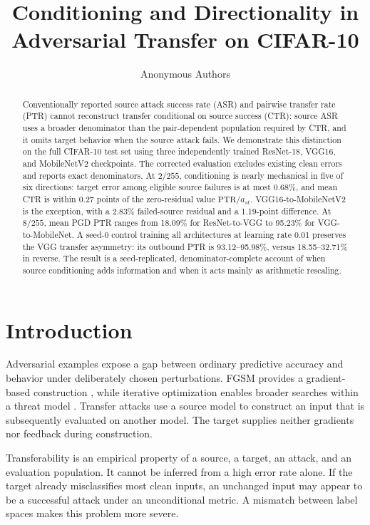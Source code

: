 \documentclass[10pt]{article}
\title{Conditioning and Directionality in Adversarial Transfer on CIFAR-10}
\author{\name Anonymous Authors}
\begin{document}
\maketitle
\begin{abstract}
Conventionally reported source attack success rate (ASR) and pairwise transfer rate (PTR) cannot reconstruct transfer conditional on source success (CTR): source ASR uses a broader denominator than the pair-dependent population required by CTR, and it omits target behavior when the source attack fails. We demonstrate this distinction on the full CIFAR-10 test set using three independently trained ResNet-18, VGG16, and MobileNetV2 checkpoints. The corrected evaluation excludes existing clean errors and reports exact denominators. At $2/255$, conditioning is nearly mechanical in five of six directions: target error among eligible source failures is at most 0.68\%, and mean CTR is within 0.27 points of the zero-residual value $\mathrm{PTR}/a_{st}$. VGG16-to-MobileNetV2 is the exception, with a 2.83\% failed-source residual and a 1.19-point difference. At $8/255$, mean PGD PTR ranges from 18.09\% for ResNet-to-VGG to 95.23\% for VGG-to-MobileNet. A seed-0 control training all architectures at learning rate 0.01 preserves the VGG transfer asymmetry: its outbound PTR is 93.12--95.98\%, versus 18.55--32.71\% in reverse. The result is a seed-replicated, denominator-complete account of when source conditioning adds information and when it acts mainly as arithmetic rescaling.
\end{abstract}

\section{Introduction}
Adversarial examples expose a gap between ordinary predictive accuracy and behavior under deliberately chosen perturbations. FGSM provides a gradient-based construction \citep{goodfellow}, while iterative optimization enables broader searches within a threat model \citep{madry,carlini}. Transfer attacks use a source model to construct an input that is subsequently evaluated on another model. The target supplies neither gradients nor feedback during construction.

Transferability is an empirical property of a source, a target, an attack, and an evaluation population. It cannot be inferred from a high error rate alone. If the target already misclassifies most clean inputs, an unchanged input may appear to be a successful attack under an unconditional metric. A mismatch between label spaces makes this problem more severe.
\end{document}
